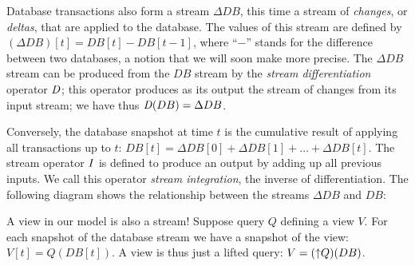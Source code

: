 Database transactions also form a stream $\Delta DB$, this time a
stream of \emph{changes}, or \emph{deltas}, that are applied to the
database.  The values of this stream are defined by $(\Delta DB)[t] =
DB[t] - DB[t-1]$, where ``$-$'' stands for the difference between two
databases, a notion that we will soon make more precise.  The $\Delta
DB$ stream can be produced from the $DB$ stream by the \emph{stream
differentiation} operator $\mathit{D}$; this operator produces as its output
the stream of changes from its input stream; we have thus $\mathit{D}(DB) =
\Delta DB$.

Conversely, the database snapshot at time $t$ is the cumulative result
of applying all transactions up to $t$: $DB[t] = \Delta DB[0] + \Delta
DB[1] + \ldots + \Delta DB[t]$.  The stream operator $\mathit{I}$ is defined
to produce an output by adding up all previous inputs.  We call this
operator \emph{stream integration}, the inverse of differentiation.
The following diagram shows the relationship between the streams
$\Delta DB$ and $DB$:
\begin{center}
\end{center}

A view in our model is also a stream!  Suppose query $Q$ defining a
view $V$.  For each snapshot of the database stream we have a snapshot
of the view: $V[t] = Q(DB[t])$.  A view is thus just a lifted query:
$V = ({\uparrow}Q)(DB)$.

